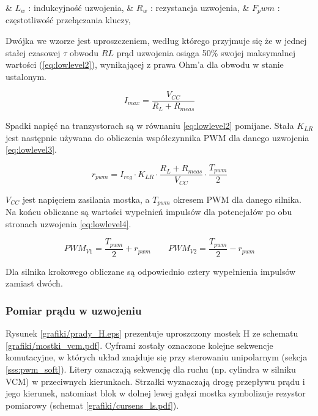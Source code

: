 \begin{easylist}
	& $ L_w $ : indukcyjność uzwojenia,
	& $ R_w $ : rezystancja uzwojenia,
	& $ F_pwm $ : częstotliwość przełączania kluczy,
	\\
\end{easylist} 

Dwójka we wzorze jest uproszczeniem, według którego przyjmuje się że w jednej stałej czasowej $ \tau $ obwodu $ RL $  prąd uzwojenia osiąga 50\% swojej maksymalnej wartości (\ref{eq:lowlevel2}), wynikającej z prawa Ohm'a dla obwodu w stanie ustalonym.

\begin{equation} \label{eq:lowlevel2}
	I_{max} = \frac{V_{CC}}{R_L + R_{meas}}
\end{equation}

Spadki napięć na tranzystorach są w równaniu \ref{eq:lowlevel2} pomijane. Stała $ K_{LR} $ jest następnie używana do obliczenia współczynnika PWM dla danego uzwojenia \ref{eq:lowlevel3}.

\begin{equation} \label{eq:lowlevel3}
	r_{pwm} = I_{reg} \cdot K_{LR} \cdot \frac{R_L + R_{meas}}{V_{CC}} \cdot \frac{T_{pwm}}{2}
\end{equation}

$ V_{CC} $ jest napięciem zasilania mostka, a $ T_{pwm} $ okresem PWM dla danego silnika. Na końcu obliczane są wartości wypełnień impulsów dla potencjałów po obu stronach uzwojenia \ref{eq:lowlevel4}.

\begin{equation} \label{eq:lowlevel4}
	PWM_{V1} = \frac{T_{pwm}}{2} + r_{pwm} 	\qquad 	PWM_{V2} = \frac{T_{pwm}}{2} - r_{pwm}
\end{equation}

Dla silnika krokowego obliczane są odpowiednio cztery wypełnienia impulsów zamiast dwóch.

\subsubsection{Pomiar prądu w uzwojeniu}

Rysunek \ref{grafiki/prady_H.eps} prezentuje uproszczony mostek H ze schematu \ref{grafiki/mostki_vcm.pdf}. Cyframi zostały oznaczone kolejne sekwencje komutacyjne, w których układ znajduje się przy sterowaniu unipolarnym (sekcja \ref{sss:pwm_soft}). Litery oznaczają sekwencję dla ruchu (np. cylindra w silniku VCM) w przeciwnych kierunkach. Strzałki wyznaczają drogę przepływu prądu i jego kierunek, natomiast blok w dolnej lewej gałęzi mostka symbolizuje rezystor pomiarowy (schemat \ref{grafiki/cursens_ls.pdf}). \\

